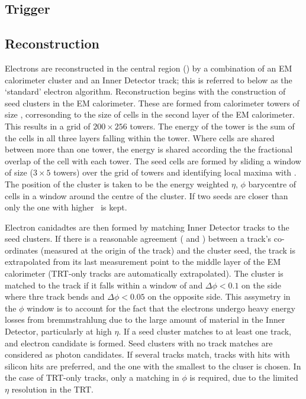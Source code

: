 \subsection{Trigger}
\label{sec:reco-el-triggers}

\subsection{Reconstruction}
Electrons are reconstructed in the central region () by a
combination of an EM calorimeter cluster and an Inner Detector track; this is
referred to below as the `standard' electron algorithm. Reconstruction begins
with the construction of seed clusters in the EM calorimeter. These are formed from
calorimeter towers of size , corresonding to the
size of cells in the second layer of the EM calorimeter. This
results in a grid of $200 \times 256$ towers. The energy
of the tower is the sum of the cells in all three layers
falling within the tower. Where cells are shared between more than one tower, the
energy is shared according the the fractional overlap of the cell with each
tower. The seed cells are formed by sliding a
window of size  ($3 \times 5$ towers) over the
grid of towers and identifying local maxima with . The position
of the cluster is taken to be the energy weighted $\eta$, $\phi$ barycentre of
cells in a window around the centre of the cluster. If two seeds are closer than
 only the one with higher \et\ is kept.

Electron canidadtes are then formed by matching Inner Detector tracks to the
seed clusters. If there is a reasonable agreement ( and
) between a track's co-ordinates (measured at the origin of the
track) and
the cluster seed, the track is extrapolated from its last measurement point to
the middle layer of the EM calorimeter (TRT-only tracks are automatically
extrapolated). The cluster is matched to the track if it falls within a window
of  and $\Delta \phi < 0.1$ on the side where thre track bends and $\Delta
\phi < 0.05$ on the opposite side. This assymetry in the $\phi$ window is to
account for the fact that the electrons undergo heavy energy losses from
bremmstrahlung due to the large amount of material in the Inner Detector,
particularly at high $\eta$. If a seed cluster matches to at least one track,
and electron candidate is formed. Seed clusters with no track matches are
considered as photon candidates. If several tracks match, tracks with hits with
silicon hits are preferred, and the one with the smallest \deltaR to the cluser
is chosen. In the case of TRT-only tracks, only a matching in $\phi$ is required, 
due to the limited $\eta$ resolution in the TRT.

